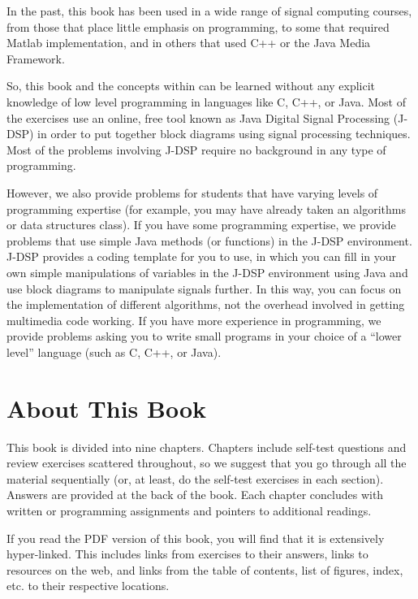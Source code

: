 In the past, this book has been used in a wide range of signal
computing courses, from those that place little emphasis on
programming, to some that required Matlab implementation, and in
others that used C++ or the Java Media Framework.

So, this book and the concepts within can be learned without any
explicit knowledge of low level programming in languages like C, C++,
or Java. Most of the exercises use an online, free tool known as Java
Digital Signal Processing (J-DSP) in order to put together block
diagrams using signal processing techniques.  Most of the problems
involving J-DSP require no background in any type of programming.

However, we also provide problems for students that have varying
levels of programming expertise (for example, you may have already
taken an algorithms or data structures class). If you have some
programming expertise, we provide problems that use simple Java
methods (or functions) in the J-DSP environment.  J-DSP provides a
coding template for you to use, in which you can fill in your own
simple manipulations of variables in the J-DSP environment using Java
and use block diagrams to manipulate signals further.  In this way,
you can focus on the implementation of different algorithms, not the
overhead involved in getting multimedia code working.  If you have
more experience in programming, we provide problems asking you to
write small programs in your choice of a ``lower level'' language
(such as C, C++, or Java).

\section*{About This Book}

This book is divided into nine chapters. Chapters include self-test
questions and review exercises scattered throughout, so we suggest
that you go through all the material sequentially (or, at least, do
the self-test exercises in each section). Answers are provided at the
back of the book. Each chapter concludes with written or programming
assignments and pointers to additional readings.

 If you read the PDF version of this book, you will find
that it is extensively hyper-linked.  This includes links from
exercises to their answers, links to resources on the web, and links
from the table of contents, list of figures, index, etc. to their
respective locations.

